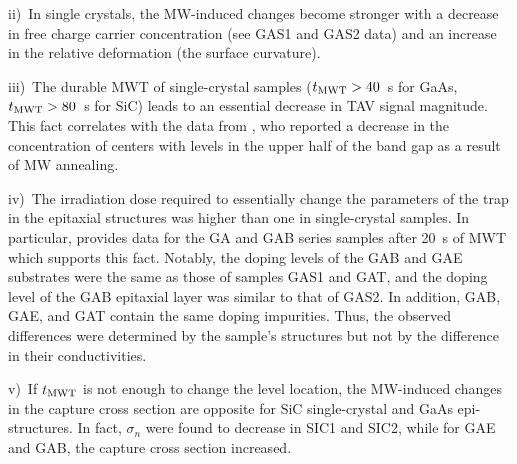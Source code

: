 \documentclass[10pt]{iopart}
\begin{document}
\noindent
ii)~In single crystals, the  MW-induced changes become stronger
with a decrease in free charge carrier concentration
(see  GAS1 and GAS2 data)
and an increase in the relative deformation (the surface curvature).

\noindent
iii)~The durable MWT of single-crystal samples ($t_{\rm MWT}>40$~s for GaAs,  $t_{\rm MWT}>80$~s for SiC)
leads to an essential decrease in TAV signal magnitude.
This fact correlates with the data  from \cite{Belyaev1998JTFEn},
who reported a decrease in the concentration of centers with levels in the upper half of the band gap as a result of MW annealing.

\noindent
iv)~The irradiation dose required to essentially change the parameters of the trap
in the epitaxial structures was higher than one in single-crystal samples.
In particular,  provides  data for the GA and GAB series samples after 20~s of MWT
which supports this fact.
Notably, the doping levels of  the GAB and GAE substrates were the same as those of samples GAS1 and GAT,
and the doping level of the GAB epitaxial layer was similar to that of GAS2.
In addition, GAB, GAE, and GAT contain the same doping impurities.
Thus, the observed differences were determined by the sample's structures
but not by the difference in their conductivities.

\noindent
v)~If $t_{\rm MWT}$ is not enough to change the level location,
the MW-induced changes in the capture cross section are opposite
for SiC single-crystal and GaAs epi-structures.
In fact,  $\sigma_n$ were found to decrease in SIC1 and SIC2,
while for GAE and GAB, the capture cross section increased.
\end{document}
